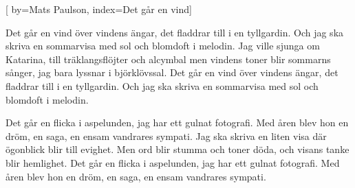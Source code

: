 


[ 	%
	by={Mats Paulson},
	index={Det går en vind}]		%
	
\beginverse*		%
Det går en vind över vindens ängar,
det fladdrar till i en tyllgardin.
Och jag ska skriva en sommarvisa
med sol och blomdoft i melodin.
Jag ville sjunga om Katarina,
till träklangsflöjter och alcymbal
men vindens toner blir sommarns sånger,
jag bara lyssnar i björklövssal.
Det går en vind över vindens ängar,
det fladdrar till i en tyllgardin.
Och jag ska skriva en sommarvisa
med sol och blomdoft i melodin.
\endverse			%

\beginverse*		%
Det går en flicka i aspelunden,
jag har ett gulnat fotografi.
Med åren blev hon en dröm, en saga,
en ensam vandrares sympati.
Jag ska skriva en liten visa
där ögonblick blir till evighet.
Men ord blir stumma och toner döda,
och visans tanke blir hemlighet.
Det går en flicka i aspelunden,
jag har ett gulnat fotografi.
Med åren blev hon en dröm, en saga,
en ensam vandrares sympati.
\endverse			%
\endsong			%
